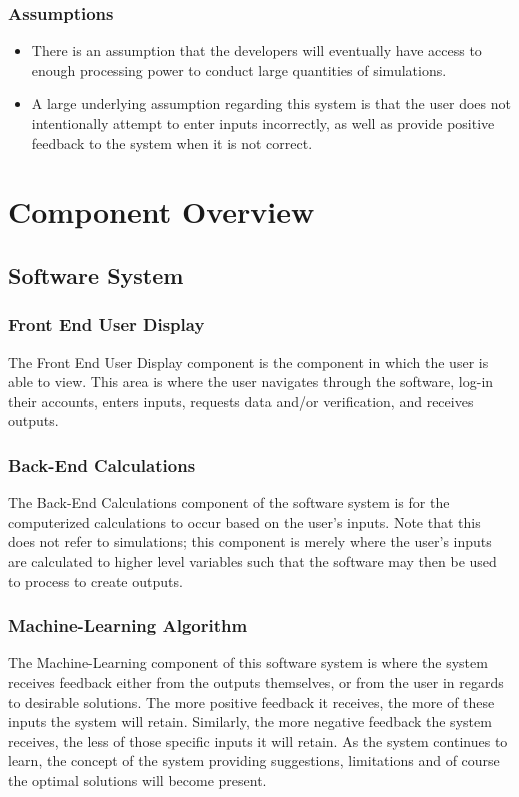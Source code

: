 \documentclass[12pt, titlepage]{article}
\begin{document}
\subsubsection{Assumptions}
\begin{itemize}
    \item There is an assumption that the developers will eventually have access to enough processing power to conduct large quantities of simulations.
    \item A large underlying assumption regarding this system is that the user does not intentionally attempt to enter inputs incorrectly, as well as provide positive feedback to the system when it is not correct.

\end{itemize}


\section{Component Overview}

\subsection{Software System}
\subsubsection{Front End User Display}
The Front End User Display component is the component in which the user is able to view. This area is where the user navigates through the software, log-in their accounts, enters inputs, requests data and/or verification, and receives outputs.

\subsubsection{Back-End Calculations}
The Back-End Calculations component of the software system is for the computerized calculations to occur based on the user’s inputs. Note that this does not refer to simulations; this component is merely where the user’s inputs are calculated to higher level variables such that the software may then be used to process to create outputs. 

\subsubsection{Machine-Learning Algorithm}
The Machine-Learning component of this software system is where the system receives feedback either from the outputs themselves, or from the user in regards to desirable solutions. The more positive feedback it receives, the more of these inputs the system will retain. Similarly, the more negative feedback the system receives, the less of those specific inputs it will retain. As the system continues to learn, the concept of the system providing suggestions, limitations and of course the optimal solutions will become present. 
\end{document}
